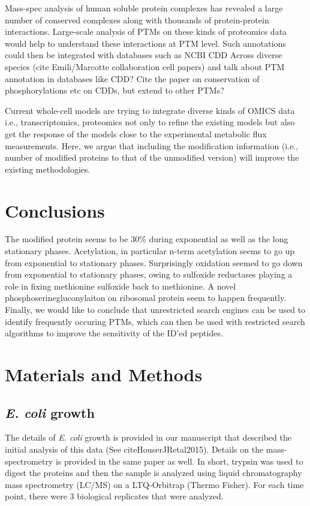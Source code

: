 \documentclass[12pt]{article}
\begin{document}
Mass-spec analysis of human soluble protein complexes has revealed a large number of conserved complexes along with thousands of protein-protein interactions. Large-scale analysis of PTMs on these kinds of proteomics data would help to understand these interactions at PTM level. Such annotations could then be integrated with databases such as NCBI CDD
Across diverse species (cite Emili/Marcotte collaboration cell papers) and talk about PTM annotation in databases like CDD? Cite the paper on conservation of phosphorylations etc on CDDs, but extend to other PTMs?

Current whole-cell models \cite{Covertetal2008} are trying to integrate diverse kinds of OMICS data i.e., transcriptomics, proteomics not only to refine the existing models but also get the response of the models close to the experimental metabolic flux measurements. Here, we argue that including the modification information (i.e., number of modified proteins to that of the unmodified version) will improve the existing methodologies.



\section{Conclusions}

The modified protein seems to be 30\% during exponential as well as the long stationary phases. Acetylation, in particular n-term acetylation seems to go up from exponential to stationary phases. Surprisingly oxidation seemed to go down from exponential to stationary phases, owing to sulfoxide reductases playing a role in fixing methionine sulfoxide back to methionine. A novel phosphoserinegluconylaiton on ribosomal protein seem to happen frequently. Finally, we would like to conclude that unrestricted search engines can be used to identify frequently occuring PTMs, which can then be used with restricted search algorithms to improve the sensitivity of the ID'ed peptides.


\section{Materials and Methods}

\subsection{\emph{E. coli} growth} 

The details of \emph{E. coli} growth is provided in our manuscript that described the initial analysis of this data (See cite{HouserJRetal2015}). Details on the mass-spectrometry is provided in the same paper as well. In short, trypsin was used to digest the proteins and then the sample is analyzed using liquid chromatography mass spectrometry (LC/MS) on a LTQ-Orbitrap (Thermo Fisher). For each time point, there were 3 biological replicates that were analyzed.
\end{document}
